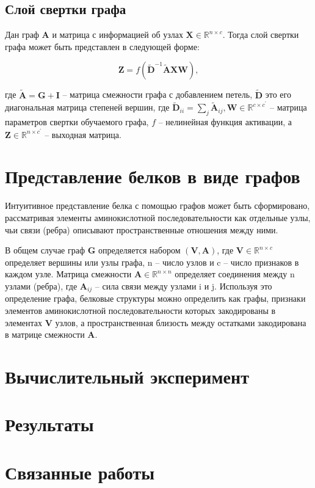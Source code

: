 \documentclass[12pt,twosides]{article}
\begin{document}
	\subsection{Слой свертки графа}
	Дан граф $\mathbf{A}$ и матрица с информацией об узлах $\mathbf{X} \in \mathbb{R}^{n \times c}$. Тогда слой свертки графа может быть представлен в следующей форме:
	
	$$\mathbf{Z}=f\left(\tilde{\mathbf{D}}^{-1} \tilde{\mathbf{A}} \mathbf{X} \mathbf{W}\right),$$
	
	где $\tilde{\mathbf{A}}=\mathbf{G}+\mathbf{I}$ – матрица смежности графа с добавлением петель, $\tilde{\mathbf{D}}$ это его диагональная матрица степеней вершин, где $\tilde{\mathbf{D}}_{i i}=\sum_{j} \tilde{\mathbf{A}}_{i j}, \mathbf{W} \in \mathbb{R}^{c \times c^{\prime}}$ – матрица параметров свертки обучаемого графа, $f$ – нелинейная функция активации, а $\mathbf{Z} \in \mathbb{R}^{n \times c^{\prime}}$ – выходная матрица.
	
	\section{Представление белков в виде графов}
	Интуитивное представление белка с помощью графов может быть сформировано, рассматривая элементы аминокислотной последовательности как отдельные узлы, чьи связи (ребра) описывают пространственные отношения между ними. 
	
	В общем случае граф $\mathbf{G}$ определяется набором $\mathbf{(V, A)}$, где $\mathbf{V}\in \mathbb{R}^{n \times c}$ определяет вершины или узлы графа, n – число узлов и c – число признаков в каждом узле. Матрица смежности $\mathbf{A}\in \mathbb{R}^{n \times n}$ определяет соединения между n узлами (ребра), где $\mathbf{A}_{ij}$ – сила связи между узлами i и j. Используя это определение графа, белковые структуры можно определить как графы, признаки элементов аминокислотной последовательности которых закодированы в элементах $\mathbf{V}$ узлов, а пространственная близость между остатками закодирована в матрице смежности $\mathbf{A}$.

	\section{Вычислительный эксперимент}
	
	\section{Результаты}
	
	\section{Связанные работы}
	

	
	\nocite{*}
	
	
\end{document}
